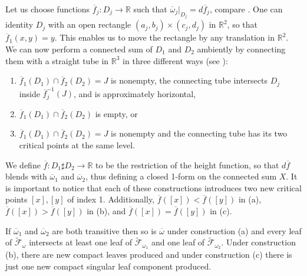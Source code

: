 \documentclass[
  a4paper, 
  reqno, 
  oneside, 
  12pt
]{amsart}
\theoremstyle{definition}
\theoremstyle{remark}
\begin{document}
Let us choose functions $\overline{f}_j:D_j\to \mathbb{R}$ such that $\overline{\omega}_j|_{D_j}=d\overline{f}_j$, compare \cite[Prop. 3.3]{V}. One can identity $D_j$ with an open rectangle $(a_j, b_j)\times (c_j, d_j)$ in $\mathbb{R}^2$, so that $\overline{f}_1(x,y)=y$. This enables us to move the rectangle by any translation in $\mathbb{R}^2$. We can now perform a connected sum of
$D_1$ and $D_2$ ambiently by connecting them with a straight tube in $\mathbb{R}^3$ in three different ways (see \cite[Fig. 9]{FKL}):

\begin{enumerate}
\item[(a)] $\overline{f}_1(D_1)\cap \overline{f}_2(D_2)=J$ is nonempty, the connecting tube intersects $D_j$ inside $\overline{f}_j^{-1}(J)$, and is
approximately horizontal,
\item[(b)] $\overline{f}_1(D_1)\cap \overline{f}_2(D_2)$ is empty, or
\item[(c)] $\overline{f}_1(D_1)\cap \overline{f}_2(D_2)=J$ is nonempty and the connecting tube has its two critical points at the same level.
 \end{enumerate}

We define $\overline{f}:D_1\sharp D_2\to \mathbb{R}$ to be the restriction of the height function, so that $d\overline{f}$ blends with $\overline{\omega}_1$ and $\overline{\omega}_2$, thus defining a closed 1-form on the connected sum $X$. It is important to notice that each of these constructions introduces two new critical points $[x], [y]$ of index 1. Additionally, $\overline{f}([x])<\overline{f}([y])$ in (a), $\overline{f}([x])>\overline{f}([y])$ in (b), and $\overline{f}([x])=\overline{f}([y])$ in (c).

If $\overline{\omega}_1$ and $\overline{\omega}_2$ are both transitive then so is $\overline{\omega}$ under construction (a) and every leaf of $\tilde{\mathcal{F}}_\omega$ intersects at least one leaf of $\tilde{\mathcal{F}}_{\omega_1}$ and one leaf of
$\tilde{\mathcal{F}}_{\omega_2}$. Under construction (b), there are new compact leaves produced and under construction
(c) there is just one new compact singular leaf component produced.
\end{document}
